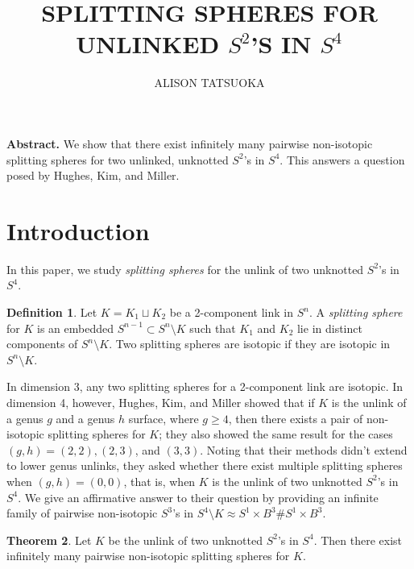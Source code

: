 \documentclass[11pt,letterpaper,twoside]{amsart}
\title{\textbf{SPLITTING SPHERES FOR UNLINKED $S^2$'S IN $S^4$}}
\author{ALISON TATSUOKA}
\date{}
\theoremstyle{definition}
\newtheorem{theorem}{Theorem}
\newtheorem{defn}[theorem]{Definition}
\begin{document}
\maketitle

\noindent \textbf{Abstract.} We show that there exist infinitely many pairwise non-isotopic splitting spheres for two unlinked, unknotted $S^2$'s in $S^4$. This answers a question posed by Hughes, Kim, and Miller.


 \section{Introduction}

\noindent In this paper, we study \textit{splitting spheres} for the unlink of two unknotted $S^2$'s in $S^4$.

\begin{defn} \label{definition of splitting sphere}
    Let $K=K_1\sqcup K_2$ be a 2-component link in $S^n$. A \textit{splitting sphere} for $K$ is an embedded $S^{n-1}\subset S^n \setminus K$ such that $K_1$ and $K_2$ lie in distinct components of $S^n \setminus K$. Two splitting spheres are isotopic if they are isotopic in $S^n \setminus K$.
\end{defn}

\noindent In dimension 3, any two splitting spheres for a 2-component link are isotopic. In dimension 4, however, Hughes, Kim, and Miller \cite{HKM} showed that if $K$ is the unlink of a genus $g$ and a genus $h$ surface, where $g\geq 4$, then there exists a pair of non-isotopic splitting spheres for $K$; they also showed the same result for the cases $(g,h)=(2,2), (2,3)$, and $(3,3)$. Noting that their methods didn't extend to lower genus unlinks, they asked whether there exist multiple splitting spheres when $(g,h)=(0,0)$, that is, when $K$ is the unlink of two unknotted $S^2$'s in $S^4$. We give an affirmative answer to their question by providing an infinite family of pairwise non-isotopic $S^3$'s in $S^4 \setminus K \approx S^1 \times B^3 \# S^1 \times B^3$.

\begin{theorem} \label{splitting}
    Let $K$ be the unlink of two unknotted $S^2$'s in $S^4$. Then there exist infinitely many pairwise non-isotopic splitting spheres for $K$.
\end{theorem}
\end{document}
